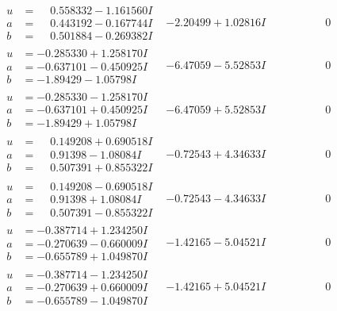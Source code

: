 \documentclass[1p]{elsarticle_modified}
\theoremstyle{definition}
\begin{document}
$$\begin{array}{c|c|c}
\begin{aligned}
u &= \phantom{-}0.558332 - 1.161560 I \\
a &= \phantom{-}0.443192 - 0.167744 I \\
b &= \phantom{-}0.501884 - 0.269382 I\end{aligned}
 & -2.20499 + 1.02816 I & \phantom{-0.000000 } 0 \\ \hline\begin{aligned}
u &= -0.285330 + 1.258170 I \\
a &= -0.637101 - 0.450925 I \\
b &= -1.89429 - 1.05798 I\end{aligned}
 & -6.47059 - 5.52853 I & \phantom{-0.000000 } 0 \\ \hline\begin{aligned}
u &= -0.285330 - 1.258170 I \\
a &= -0.637101 + 0.450925 I \\
b &= -1.89429 + 1.05798 I\end{aligned}
 & -6.47059 + 5.52853 I & \phantom{-0.000000 } 0 \\ \hline\begin{aligned}
u &= \phantom{-}0.149208 + 0.690518 I \\
a &= \phantom{-}0.91398 - 1.08084 I \\
b &= \phantom{-}0.507391 + 0.855322 I\end{aligned}
 & -0.72543 + 4.34633 I & \phantom{-0.000000 } 0 \\ \hline\begin{aligned}
u &= \phantom{-}0.149208 - 0.690518 I \\
a &= \phantom{-}0.91398 + 1.08084 I \\
b &= \phantom{-}0.507391 - 0.855322 I\end{aligned}
 & -0.72543 - 4.34633 I & \phantom{-0.000000 } 0 \\ \hline\begin{aligned}
u &= -0.387714 + 1.234250 I \\
a &= -0.270639 - 0.660009 I \\
b &= -0.655789 + 1.049870 I\end{aligned}
 & -1.42165 - 5.04521 I & \phantom{-0.000000 } 0 \\ \hline\begin{aligned}
u &= -0.387714 - 1.234250 I \\
a &= -0.270639 + 0.660009 I \\
b &= -0.655789 - 1.049870 I\end{aligned}
 & -1.42165 + 5.04521 I & \phantom{-0.000000 } 0 \\ \hline\begin{aligned}

\end{aligned}
\end{array}$$
\end{document}
